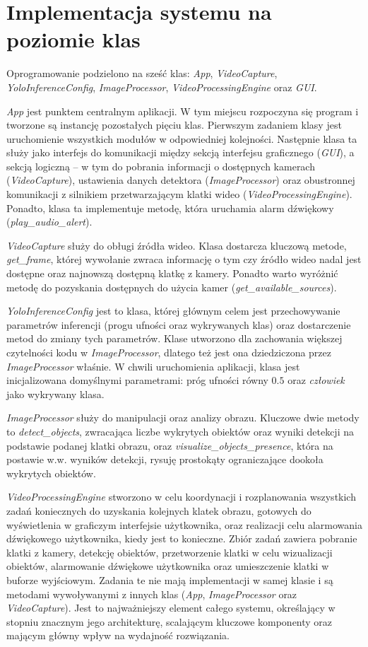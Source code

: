 \section{Implementacja systemu na poziomie klas}
Oprogramowanie podzielono na sześć klas: \emph{App}, \emph{VideoCapture}, \emph{YoloInferenceConfig}, \emph{ImageProcessor}, \emph{VideoProcessingEngine} oraz \emph{GUI}.

\emph{App} jest punktem centralnym aplikacji. W tym miejscu rozpoczyna się program i tworzone są instancję pozostałych pięciu klas. Pierwszym zadaniem klasy jest uruchomienie wszystkich modułów w odpowiedniej kolejności. Następnie klasa ta służy jako interfejs do komunikacji między sekcją interfejsu graficznego (\emph{GUI}), a sekcją logiczną -- w tym do pobrania informacji o dostępnych kamerach (\emph{VideoCapture}), ustawienia danych detektora (\emph{ImageProcessor}) oraz obustronnej komunikacji z silnikiem przetwarzającym klatki wideo (\emph{VideoProcessingEngine}). 
Ponadto, klasa ta implementuje metodę, która uruchamia alarm dźwiękowy (\emph{{play\_audio\_alert}}). 

\emph{VideoCapture} służy do obługi źródła wideo. Klasa dostarcza kluczową metode, \emph{get\_frame}, której wywołanie zwraca informację o tym czy źródło wideo nadal jest dostępne oraz najnowszą dostępną klatkę z kamery. Ponadto warto wyróżnić metodę do pozyskania dostępnych do użycia kamer (\emph{get\_available\_sources}).

\emph{YoloInferenceConfig} jest to klasa, której głównym celem jest przechowywanie parametrów inferencji (progu ufności oraz wykrywanych klas) oraz dostarczenie metod do zmiany tych parametrów. Klase utworzono dla zachowania większej czytelności kodu w \emph{ImageProcessor}, dlatego też jest ona dziedziczona przez \emph{ImageProcessor} właśnie. W chwili uruchomienia aplikacji, klasa jest inicjalizowana domyślnymi parametrami: próg ufności równy $0.5$ oraz \emph{człowiek} jako wykrywany klasa. 

\emph{ImageProcessor} służy do manipulacji oraz analizy obrazu. Kluczowe dwie metody to \emph{detect\_objects}, zwracająca liczbe wykrytych obiektów oraz wyniki detekcji na podstawie podanej klatki obrazu, oraz \emph{visualize\_objects\_presence}, która na postawie w.w. wyników detekcji, rysuję prostokąty ograniczające dookoła wykrytych obiektów.

\emph{VideoProcessingEngine} stworzono w celu koordynacji i rozplanowania wszystkich zadań koniecznych do uzyskania kolejnych klatek obrazu, gotowych do wyświetlenia w graficzym interfejsie użytkownika, oraz realizacji celu alarmowania dźwiękowego użytkownika, kiedy jest to konieczne. Zbiór zadań zawiera pobranie klatki z kamery, detekcję obiektów, przetworzenie klatki w celu wizualizacji obiektów, alarmowanie dźwiękowe użytkownika oraz umieszczenie klatki w buforze wyjściowym. Zadania te nie mają implementacji w samej klasie i są metodami wywoływanymi z innych klas (\emph{App}, \emph{ImageProcessor} oraz \emph{VideoCapture}). Jest to najważniejszy element całego systemu, określający w stopniu znacznym jego architekturę, scalającym kluczowe komponenty oraz mającym główny wpływ na wydajność rozwiązania.

